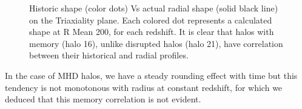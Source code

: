 \begin{figure}[!ht]
  \centering
  \hfill
  \caption{Historic shape (color dots) Vs actual radial shape (solid black line) on the Triaxiality plane. Each colored dot represents a calculated shape at R Mean 200, for each redshift. It is clear that halos with memory (halo 16), unlike disrupted halos (halo 21), have correlation between their historical and radial profiles.}
  \label{fig:RedshiftDM}
\end{figure}


In the case of MHD halos, we have a steady rounding effect with time but this tendency is not monotonous with radius at constant redshift, for which we deduced that this memory correlation is not evident.\\




 
